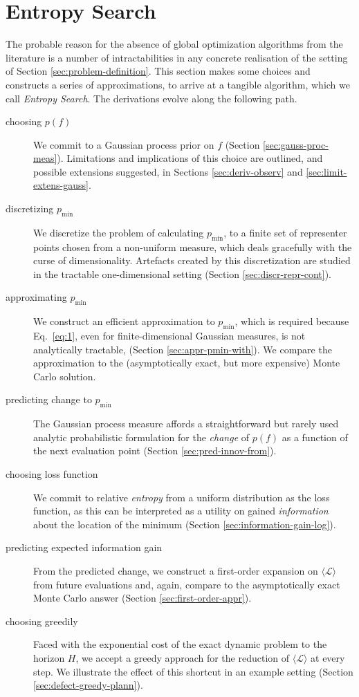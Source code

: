 \documentclass[twoside,11pt]{article}
\renewcommand{\L}{\mathcal{L}}
\newcommand{\pmin}{p_{\min}}
\begin{document}
\section{Entropy Search}
\label{sec:concrete-algorithm}

The probable reason for the absence of global optimization algorithms
from the literature is a number of intractabilities in any concrete
realisation of the setting of Section
\ref{sec:problem-definition}. This section makes some choices and
constructs a series of approximations, to arrive at a tangible
algorithm, which we call \emph{Entropy Search}. The derivations evolve
along the following path.
\begin{description}
\item[choosing $p(f)$] We commit to a Gaussian process prior on $f$
  (Section \ref{sec:gauss-proc-meas}). Limitations and implications of
  this choice are outlined, and possible extensions suggested, in
  Sections \ref{sec:deriv-observ} and \ref{sec:limit-extens-gauss}.
\item[discretizing $\pmin$] We discretize the problem of calculating
  $\pmin$, to a finite set of representer points chosen from a
  non-uniform measure, which deals gracefully with the curse of
  dimensionality. Artefacts created by this discretization are studied
  in the tractable one-dimensional setting (Section
  \ref{sec:discr-repr-cont}).
\item[approximating $\pmin$] We construct an efficient approximation
  to $\pmin$, which is required because Eq.\ \eqref{eq:1}, even for
  finite-dimensional Gaussian measures, is not analytically tractable,
  (Section \ref{sec:appr-pmin-with}). We compare the approximation to
  the (asymptotically exact, but more expensive) Monte Carlo solution.
\item[predicting change to $\pmin$] The Gaussian process measure affords
  a straightforward but rarely used analytic probabilistic formulation
  for the \emph{change} of $p(f)$ as a function of the next evaluation
  point (Section \ref{sec:pred-innov-from}).
\item[choosing loss function] We commit to relative \emph{entropy}
  from a uniform distribution as the loss function, as this can be
  interpreted as a utility on gained \emph{information} about the
  location of the minimum (Section \ref{sec:information-gain-log}).
\item[predicting expected information gain] From the predicted change,
  we construct a first-order expansion on $\langle \L \rangle$ from
  future evaluations and, again, compare to the asymptotically exact
  Monte Carlo answer (Section \ref{sec:first-order-appr}).
\item[choosing greedily] Faced with the exponential cost of the exact
  dynamic problem to the horizon $H$, we accept a greedy approach for
  the reduction of $\langle \L\rangle$ at every step. We illustrate
  the effect of this shortcut in an example setting (Section
  \ref{sec:defect-greedy-plann}).
\end{description}
\end{document}
